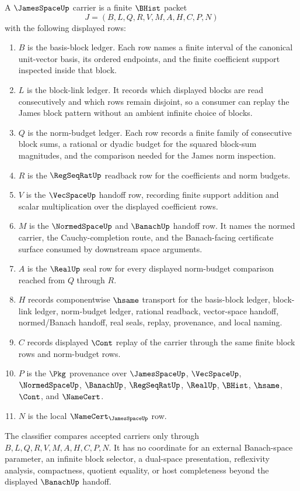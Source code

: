 \begin{definition}
\label{def:james-space-carrier}
A $\JamesSpaceUp$ carrier is a finite $\BHist$ packet
$$
J=(B,L,Q,R,V,M,A,H,C,P,N)
$$
with the following displayed rows:
\begin{enumerate}
\item $B$ is the basis-block ledger. Each row names a finite interval of the canonical unit-vector basis, its ordered endpoints, and the finite coefficient support inspected inside that block.
\item $L$ is the block-link ledger. It records which displayed blocks are read consecutively and which rows remain disjoint, so a consumer can replay the James block pattern without an ambient infinite choice of blocks.
\item $Q$ is the norm-budget ledger. Each row records a finite family of consecutive block sums, a rational or dyadic budget for the squared block-sum magnitudes, and the comparison needed for the James norm inspection.
\item $R$ is the $\RegSeqRatUp$ readback row for the coefficients and norm budgets.
\item $V$ is the $\VecSpaceUp$ handoff row, recording finite support addition and scalar multiplication over the displayed coefficient rows.
\item $M$ is the $\NormedSpaceUp$ and $\BanachUp$ handoff row. It names the normed carrier, the Cauchy-completion route, and the Banach-facing certificate surface consumed by downstream space arguments.
\item $A$ is the $\RealUp$ seal row for every displayed norm-budget comparison reached from $Q$ through $R$.
\item $H$ records componentwise $\hsame$ transport for the basis-block ledger, block-link ledger, norm-budget ledger, rational readback, vector-space handoff, normed/Banach handoff, real seals, replay, provenance, and local naming.
\item $C$ records displayed $\Cont$ replay of the carrier through the same finite block rows and norm-budget rows.
\item $P$ is the $\Pkg$ provenance over $\JamesSpaceUp$, $\VecSpaceUp$, $\NormedSpaceUp$, $\BanachUp$, $\RegSeqRatUp$, $\RealUp$, $\BHist$, $\hsame$, $\Cont$, and $\NameCert$.
\item $N$ is the local $\NameCert_{\JamesSpaceUp}$ row.
\end{enumerate}
The classifier compares accepted carriers only through $B,L,Q,R,V,M,A,H,C,P,N$. It has no coordinate for an external Banach-space parameter, an infinite block selector, a dual-space presentation, reflexivity analysis, compactness, quotient equality, or host completeness beyond the displayed $\BanachUp$ handoff.
\end{definition}

